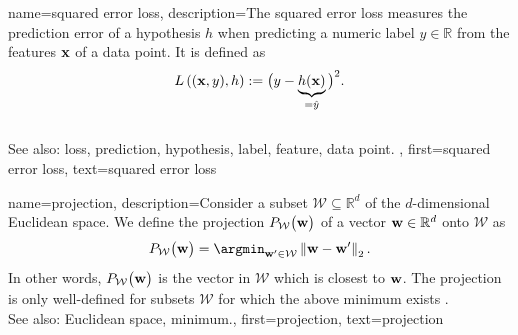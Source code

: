 
{name={squared error loss},
description={The squared 
		error loss measures the prediction error of a 
		hypothesis $h$ when predicting a numeric label $y \in \mathbb{R}$ 
		from the features ${\bf x}$ of a data point. It is 
	defined as 
\begin{equation} 
	\nonumber

	L\left(({\bf x},y),h \right) := \big(y - \underbrace{h({\bf x})}_{=\hat{y}} \big)^{2}. 
\end{equation} 
			\\ 
		See also: loss, prediction, hypothesis, label, feature, data point.
},
first={squared error loss},
text={squared error loss}
}


 {name={projection}, 
       description={Consider a subset $\mathcal{W} \subseteq \mathbb{R}^{d}$ of 
	   the $d$-dimensional Euclidean space. We define the projection $P_{\mathcal{W}}\big( {\bf w}\big) $
	   of a vector ${\bf w} \in \mathbb{R}^{d}$ onto $\mathcal{W}$ as
		\begin{equation} 
   	    \label{equ_def_proj_generic_dict}
  	     P_{\mathcal{W}}\big( {\bf w}\big)  = \argmin_{{\bf w}' \in \mathcal{W}} \left\Vert  {{\bf w} - {\bf w}'} \right\Vert_{2}. 
         \end{equation}
		 In other words, $P_{\mathcal{W}}\big( {\bf w}\big) $ is the vector in $\mathcal{W}$ 
		 which is closest to ${\bf w}$. The projection is only well-defined for subsets $\mathcal{W}$ 
		 for which the above minimum exists \cite{BoydConvexBook}.
		 			\\ 
		See also: Euclidean space, minimum.},
		 first={projection},
		 text={projection}
}


